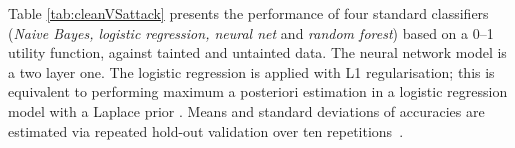 Table \ref{tab:cleanVSattack} presents the performance
of four standard classifiers ({\em  Naive Bayes, logistic regression, neural net} and {\em  random forest}) based on a 0--1 utility function, against tainted and untainted data. The neural network model is a two layer one. The logistic regression is applied with L1 regularisation; {this  is equivalent to performing maximum a posteriori estimation in a logistic regression model with a Laplace prior \parencite{park2008bayesian}}. %
Means and standard deviations of accuracies are estimated via repeated hold-out validation over ten repetitions~\parencite{kim2009estimating}.
%


